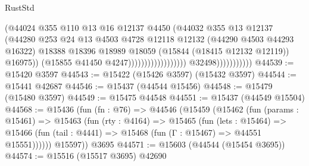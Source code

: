 \begin{lexlean}{RustStd}
\begin{coremodule}
                                                          (@44024
                                                            @355
                                                            @110
                                                            @13
                                                            @16
                                                            @12137
                                                            @4450
                                                            (@44032
                                                              @355
                                                              @13
                                                              @12137
                                                              (@44280
                                                                @253
                                                                @24
                                                                @13
                                                                @4503
                                                                @4728
                                                                @12118
                                                                @12132
                                                                (@44290 @4503 @44293 @16322)
                                                                @18388
                                                                @18396
                                                                @18989
                                                                @18059
                                                                (@15844 (@18415 @12132 @12119))
                                                                @16975))
                                                            (@15855 @41450 @4247))))))))))))))))))
                          @32498)))))))))))
@44539 := @15420 @3597
@44543 := @15422 (@15426 @3597) (@15432 @3597)
@44544 := @15441 @42687
@44546 := @15437 (@44544 @15456)
@44548 := @15479 (@15480 @3597)
@44549 := @15475 @44548
@44551 := @15437 (@44549 @15504)
@44568 := @15436
    (fun (fn : @76) =>
    @44546
      (@15459
        (@15462
          (fun (params : @15461) =>
          @15463
            (fun (rty : @4164) =>
            @15465
              (fun (lets : @15464) =>
              @15466 (fun (tail : @4441) => @15468 (fun (Γ : @15467) => @44551 @15551))))))
        @15597))
    @3695
@44571 := @15603 (@44544 (@15454 @3695))
@44574 := @15516 (@15517 @3695) @42690

\end{coremodule}
\end{lexlean}
